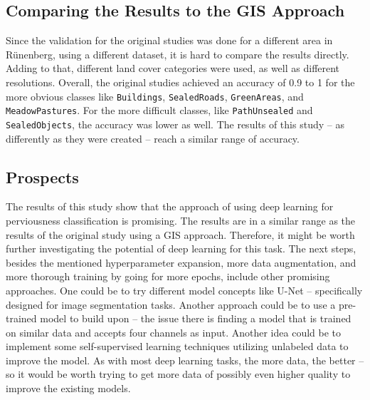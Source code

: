 \subsection{Comparing the Results to the GIS Approach}

Since the validation for the original studies was done for a different area in Rünenberg,
using a different dataset, it is hard to compare the results directly. Adding to that,
different land cover categories were used, as well as different resolutions. Overall, the
original studies achieved an accuracy of 0.9 to 1 for the more obvious classes like
\texttt{Buildings}, \texttt{SealedRoads}, \texttt{GreenAreas}, and \texttt{MeadowPastures}. 
For the more difficult classes, like \texttt{PathUnsealed} and \texttt{SealedObjects}, the
accuracy was lower as well. The results of this study -- as differently as they were created --
reach a similar range of accuracy.

\subsection{Prospects}

The results of this study show that the approach of using deep learning for perviousness
classification is promising. The results are in a similar range as the results of the
original study using a GIS approach. Therefore, it might be worth further investigating
the potential of deep learning for this task. The next steps, besides the mentioned hyperparameter
expansion, more data augmentation, and more thorough training by going for more epochs, include other
promising approaches. One could be to try different model concepts like U-Net -- specifically
designed for image segmentation tasks. Another approach could be to use a pre-trained model
to build upon -- the issue there is finding a model that is trained on similar data and
accepts four channels as input. Another idea could be to implement some self-supervised
learning techniques utilizing unlabeled data to improve the model. As with most deep
learning tasks, the more data, the better -- so it would be worth trying to get more data
of possibly even higher quality to improve the existing models.
